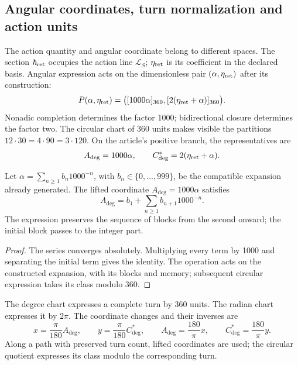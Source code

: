 \subsection{Angular coordinates, turn normalization and action units}
\label{v:v:ant:sec:ii-angulos}

The action quantity and angular coordinate belong to different spaces. The section \(\hbar_{\rm ret}\) occupies the action line \(\mathcal L_S\); \(\eta_{\rm ret}\) is its coefficient in the declared basis. Angular expression acts on the dimensionless pair \((\alpha,\eta_{\rm ret})\) after its construction:
\begin{equation}
 \mathcal P(\alpha,\eta_{\rm ret})
 =\bigl([1000\alpha]_{360},[2(\eta_{\rm ret}+\alpha)]_{360}\bigr).
 \label{v:v:ant:eq:ii-par-angular}
\end{equation}
Nonadic completion determines the factor 1000; bidirectional closure determines the factor two. The circular chart of 360 units makes visible the partitions \(12\cdot30=4\cdot90=3\cdot120\). On the article's positive branch, the representatives are
\[
 A_{\deg}=1000\alpha,\qquad
 C^*_{\deg}=2(\eta_{\rm ret}+\alpha).
\]

\begin{proposition}
\label{v:v:ant:prop:ii-desplazamiento-angular}
Let \(\alpha=\sum_{n\geq1}b_n1000^{-n}\), with
\(b_n\in\{0,\ldots,999\}\), be the compatible expansion already generated.
The lifted coordinate \(A_{\deg}=1000\alpha\) satisfies
\[
 A_{\deg}=b_1+\sum_{n\geq1}b_{n+1}1000^{-n}.
\]
The expression preserves the sequence of blocks from the second onward; the initial block passes to the integer part.
\end{proposition}
\begin{proof}
The series converges absolutely. Multiplying every term by 1000 and separating the initial term gives the identity. The operation acts on the constructed expansion, with its blocks and memory; subsequent circular expression takes its class modulo 360.
\end{proof}

\begin{definition}
The degree chart expresses a complete turn by 360 units. The radian chart expresses it by \(2\pi\). The coordinate changes and their inverses are
\[
 x=\frac{\pi}{180}A_{\deg},\qquad
 y=\frac{\pi}{180}C^*_{\deg},\qquad
 A_{\deg}=\frac{180}{\pi}x,\qquad
 C^*_{\deg}=\frac{180}{\pi}y.
\]
Along a path with preserved turn count, lifted coordinates are used; the circular quotient expresses its class modulo the corresponding turn.
\end{definition}

